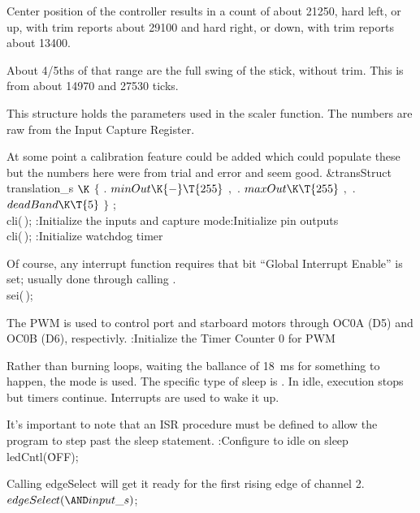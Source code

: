 Center position of the controller results in a count of  about 21250,
hard left, or up, with trim reports about 29100 and hard right, or down,
with trim reports about 13400.

About 4/5ths of that range are the full swing of the stick, without trim.
This is from about 14970 and 27530 ticks.

This  structure holds the parameters used in the scaler
function.
The  numbers are raw from the Input Capture Register.

At some point a calibration feature could be added which could populate these
but the numbers here were from trial and error and seem good.
\Y\B\&{transStruct} \\{translation\_s} $\K$ $\{$ $.$ $\\{minOut}\K{-}\T{255}$
$,$ $.$ $\\{maxOut}\K\T{255}$ $,$ $.$ $\\{deadBand}\K\T{5}$ $\}$  ;\6
\\{cli}(\,);\7
:Initialize the inputs and capture mode\X{}:Initialize pin outputs\X%
\\{cli}(\,);\6
:Initialize watchdog timer\X\Y\par
\fi

Of course, any interrupt function requires that bit ``Global Interrupt Enable''
is set; usually done through calling .
\Y\B\\{sei}(\,);\Y\par
\fi


The PWM is used to control port and starboard motors through OC0A (D5) and
OC0B (D6), respectivly.
\Y\B{}:Initialize the Timer Counter 0 for PWM\X\par
\fi

Rather than burning loops, waiting the ballance of 18~ms for something to
happen, the  mode is used.
The specific type of sleep is .
In idle, execution stops but timers continue.
Interrupts are used to wake it up.

It's important to note that an ISR procedure must be defined to allow the
program to step past the sleep statement.
\Y\B{}:Configure to idle on sleep\X\7
\\{ledCntl}(\.{OFF});\par
\fi

Calling edgeSelect will get it ready for the first rising edge of channel 2.
\Y\B$\\{edgeSelect}({\AND}\\{input\_s}){}$;\par
\fi

